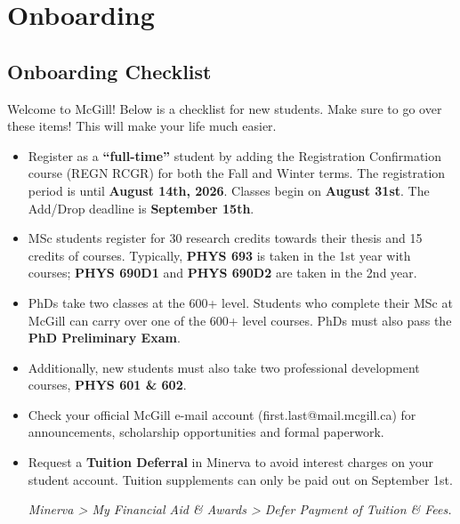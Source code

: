\chapter{Onboarding}
    \section{Onboarding Checklist} 
Welcome to McGill! Below is a checklist for new students. Make sure to go over these items! This will make your life much easier.

\begin{itemize}[
    label={$\square$},
    leftmargin=1.8em,
    itemsep=1em
]

    \item Register as a \textbf{``full-time''} student by adding the Registration Confirmation course (REGN RCGR) for both the Fall and Winter terms. The registration period is until \textbf{August 14th, 2026}. Classes begin on \textbf{August 31st}. The Add/Drop deadline is \textbf{September 15th}.
    
    \item MSc students register for 30 research credits towards their thesis and 15 credits of courses. Typically, \textbf{PHYS 693} is taken in the 1st year with courses; \textbf{PHYS 690D1} and \textbf{PHYS 690D2} are taken in the 2nd year.

    \item PhDs take two classes at the 600+ level. Students who complete their MSc at McGill can carry over one of the 600+ level courses. PhDs must also pass the \textbf{PhD Preliminary Exam}.

    \item Additionally, new students must also take two professional development courses, \textbf{PHYS 601 \& 602}. 

    \item Check your official McGill e-mail account (first.last@mail.mcgill.ca) for announcements, scholarship opportunities and formal paperwork.

    \item Request a \textbf{Tuition Deferral} in Minerva to avoid interest charges on your student account. Tuition supplements can only be paid out on September 1st.

    \textit{Minerva > My Financial Aid \& Awards > Defer Payment of Tuition \& Fees.}


\end{itemize}
